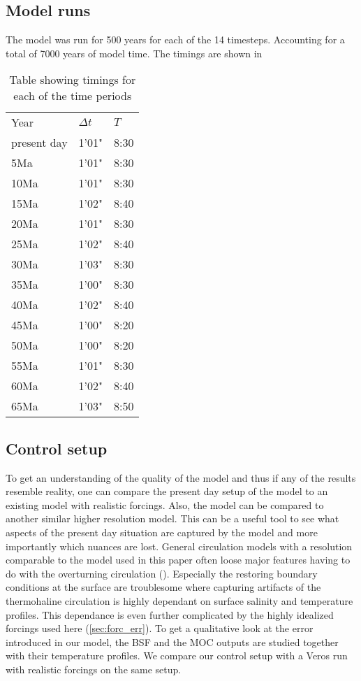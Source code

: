 \subsection{Model runs}
The model was run for 500 years for each of the 14 timesteps. Accounting for a total of 7000 years of model time. The timings are shown in 
\begin{table}[H]
	\centering
	\begin{tabular}{lll}
Year & $\Delta t$ & $T$ \\
present day & 1'01" & 8:30 \\
5Ma& 1'01" & 8:30 \\
10Ma & 1'01" & 8:30 \\
15Ma & 1'02" & 8:40 \\
20Ma & 1'01" & 8:30 \\
25Ma & 1'02" & 8:40 \\
30Ma & 1'03" & 8:30 \\
35Ma & 1'00" & 8:30 \\
40Ma & 1'02" & 8:40 \\
45Ma & 1'00" & 8:20 \\
50Ma & 1'00" & 8:20 \\
55Ma & 1'01" & 8:30 \\
60Ma & 1'02" & 8:40 \\
65Ma & 1'03" & 8:50 \\
	\end{tabular}
\caption{Table showing timings for each of the time periods}
\end{table}

\subsection{Control setup}

To get an understanding of the quality of the model and thus if any of the results resemble reality, one can compare the present day setup of the model to an existing model with realistic forcings. Also, the model can be compared to another similar higher resolution model. This can be a useful tool to see what aspects of the present day situation are captured by the model and more importantly which nuances are lost. General circulation models with a resolution comparable to the model used in this paper often loose major features having to do with the overturning circulation (\cite{stone1990limitations}). Especially the restoring boundary conditions at the surface are troublesome where capturing artifacts of the thermohaline circulation is highly dependant on surface salinity and temperature profiles. This dependance is even further complicated by the highly idealized forcings used here (\cref{sec:forc_err}). To get a qualitative look at the error introduced in our model, the BSF and the MOC outputs are studied together with their temperature profiles. We compare our control setup with a Veros run with realistic forcings on the same setup.

